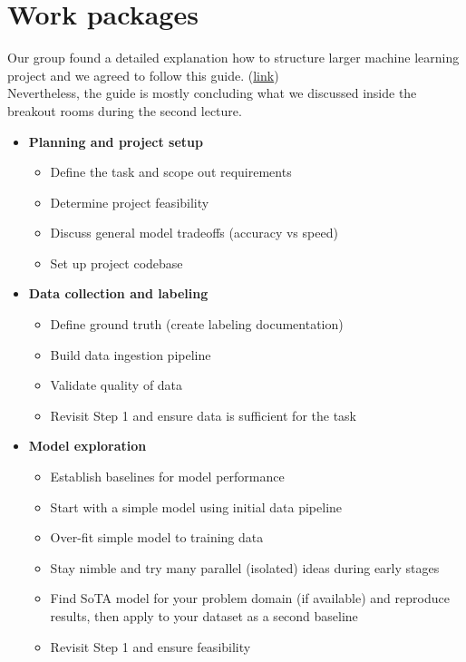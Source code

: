 \documentclass[lang=english,inputenc=utf8,fontsize=10pt]{ldvarticle}
\begin{document}
\section{Work packages}
\label{workp}
Our group found a detailed explanation how to structure larger machine learning project and we agreed to follow this guide. (\href{https://www.jeremyjordan.me/ml-projects-guide/}{link}) \\
Nevertheless, the guide is mostly concluding what we discussed inside the breakout rooms during the second lecture.\\
\begin{itemize}
    \item \textbf{Planning and project setup}
    \begin{itemize}
        \item Define the task and scope out requirements
        \item Determine project feasibility
        \item Discuss general model tradeoffs (accuracy vs speed)
        \item Set up project codebase
    \end{itemize}
    \item \textbf{Data collection and labeling}
    \begin{itemize}
        \item Define ground truth (create labeling documentation)
        \item Build data ingestion pipeline
        \item Validate quality of data
        \item Revisit Step 1 and ensure data is sufficient for the task
    \end{itemize}
    \item \textbf{Model exploration}
    \begin{itemize}
        \item Establish baselines for model performance
        \item Start with a simple model using initial data pipeline
        \item Over-fit simple model to training data
        \item Stay nimble and try many parallel (isolated) ideas during early stages
        \item Find SoTA model for your problem domain (if available) and reproduce results, then apply to your dataset as a second baseline
        \item Revisit Step 1 and ensure feasibility

\end{itemize}
\end{itemize}
\end{document}
